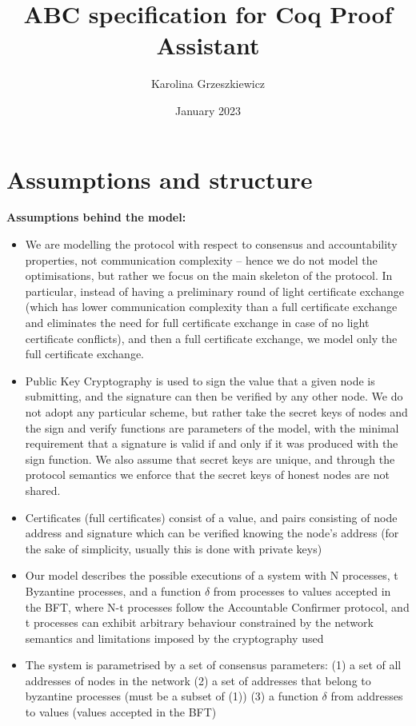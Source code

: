 \documentclass{article}
\title{ABC specification for Coq Proof Assistant}
\author{Karolina Grzeszkiewicz }
\date{January 2023}
\begin{document}
\maketitle

\section{Assumptions and structure}

\textbf{Assumptions behind the model:}
\begin{itemize}
    \item We are modelling the protocol with respect to consensus and accountability properties, not communication complexity – hence we do not model the optimisations, but rather we focus on the main skeleton of the protocol. In particular, instead of having a preliminary round of light certificate exchange (which has lower communication complexity than a full certificate exchange and eliminates the need for full certificate exchange in case of no light certificate conflicts), and then a full certificate exchange, we model only the full certificate exchange.
    \item Public Key Cryptography is used to sign the value that a given node is submitting, and the signature can then be verified by any other node. We do not adopt any particular scheme, but rather take the secret keys of nodes and the sign and verify functions are parameters of the model, with the minimal requirement that a signature is valid if and only if it was produced with the sign function. We also assume that secret keys are unique, and through the protocol semantics we enforce that the secret keys of honest nodes are not shared.  
    \item Certificates (full certificates) consist of a value, and pairs consisting of node address and signature which can be verified knowing the node's address (for the sake of simplicity, usually this is done with private keys)
    \item Our model describes the possible executions of a system with N processes, t Byzantine processes, and a function $\delta$ from processes to values accepted in the BFT, where N-t processes follow the Accountable Confirmer protocol, and t processes can exhibit arbitrary behaviour constrained by the network semantics and limitations imposed by the cryptography used
    \item The system is parametrised by a set of consensus parameters: (1) a set of all addresses of nodes in the network (2) a set of addresses that belong to byzantine processes (must be a subset of (1)) (3) a function $\delta$ from addresses to values (values accepted in the BFT)
\end{itemize}
\vspace{3mm}
\end{document}
